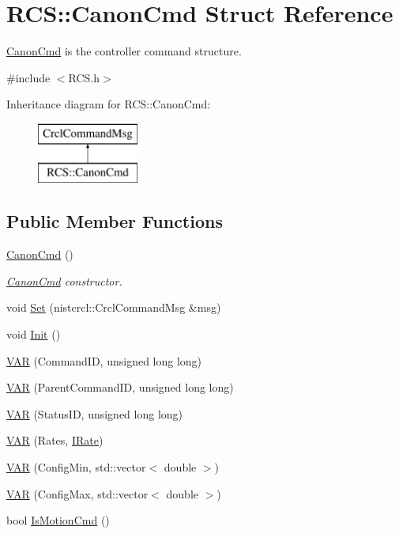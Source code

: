 \hypertarget{structRCS_1_1CanonCmd}{\section{R\-C\-S\-:\-:Canon\-Cmd Struct Reference}
\label{structRCS_1_1CanonCmd}
}


\hyperlink{structRCS_1_1CanonCmd}{Canon\-Cmd} is the controller command structure.  




{\ttfamily \#include $<$R\-C\-S.\-h$>$}

Inheritance diagram for R\-C\-S\-:\-:Canon\-Cmd\-:\begin{figure}[H]
\begin{center}
\leavevmode
\includegraphics[height=2.000000cm]{structRCS_1_1CanonCmd}
\end{center}
\end{figure}
\subsection*{Public Member Functions}
\begin{DoxyCompactItemize}
\item 
\hyperlink{structRCS_1_1CanonCmd_a29c997874838bcca02aea1200bb785eb}{Canon\-Cmd} ()
\begin{DoxyCompactList}\small\item\em \hyperlink{structRCS_1_1CanonCmd}{Canon\-Cmd} constructor. \end{DoxyCompactList}\item 
void \hyperlink{structRCS_1_1CanonCmd_af6d6fbdc2cbb6a22ebfa58023186bd2a}{Set} (nistcrcl\-::\-Crcl\-Command\-Msg \&msg)
\item 
void \hyperlink{structRCS_1_1CanonCmd_acc6132ab423f9349c970785d9f06d542}{Init} ()
\item 
\hyperlink{structRCS_1_1CanonCmd_a493a750837dc6e140e218f4d800faf72}{V\-A\-R} (Command\-I\-D, unsigned long long)
\item 
\hyperlink{structRCS_1_1CanonCmd_a052f3e27333e03886a95a7844e92b71c}{V\-A\-R} (Parent\-Command\-I\-D, unsigned long long)
\item 
\hyperlink{structRCS_1_1CanonCmd_a38899ecf42f1c5ca2921508dea054e3e}{V\-A\-R} (Status\-I\-D, unsigned long long)
\item 
\hyperlink{structRCS_1_1CanonCmd_aefa3700ebd88b157b3975c39d69b0edf}{V\-A\-R} (Rates, \hyperlink{classRCS_1_1IRate}{I\-Rate})
\item 
\hyperlink{structRCS_1_1CanonCmd_ac2c55be3c1e660f75781f0865ae4f4ad}{V\-A\-R} (Config\-Min, std\-::vector$<$ double $>$)
\item 
\hyperlink{structRCS_1_1CanonCmd_a317129138dc1effa47b81073ec08a375}{V\-A\-R} (Config\-Max, std\-::vector$<$ double $>$)
\item 
bool \hyperlink{structRCS_1_1CanonCmd_ab316e8d36adcebbe7b315cb1ed5fe86b}{Is\-Motion\-Cmd} ()
\end{DoxyCompactItemize}
